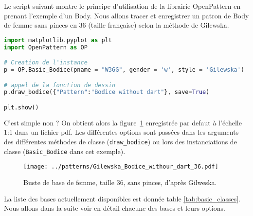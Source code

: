 \documentclass[10pt,a4paper,twoside]{report}
\begin{document}
Le script suivant montre le principe d'utilisation de la librairie OpenPattern en prenant l'exemple d'un Body.  Nous allons tracer et enregistrer un patron de Body de femme sans pinces en 36 (taille française) selon la méthode de Gilewska.

\begin{lstlisting}[language=python]
import matplotlib.pyplot as plt
import OpenPattern as OP

# Creation de l'instance
p = OP.Basic_Bodice(pname = "W36G", gender = 'w', style = 'Gilewska')

# appel de la fonction de dessin
p.draw_bodice({"Pattern":"Bodice without dart"}, save=True)

plt.show()
\end{lstlisting}

C'est simple non ? On obtient alors la figure~\ref{fig:bodice_WG36} enregistrée par defaut à l'échelle 1:1 dans un fichier pdf. Les différentes options sont passées dans les arguments des différentes méthodes de classe (\texttt{draw\_bodice}) ou lors des instanciations de classe (\texttt{Basic\_Bodice} dans cet exemple).



\begin{figure}[hbtp]
\centering
\texttt{[image: ../patterns/Gilewska\_Bodice\_withour\_dart\_36.pdf]}
\caption{Buste de base de femme, taille 36, sans pinces, d'après Gilweska.}
\label{fig:bodice_WG36}
\end{figure}

La liste des bases actuellement disponibles est donnée table \ref{tab:basic_classes}. Nous allons dans la suite voir en détail chacune des bases et leurs options.
\end{document}
